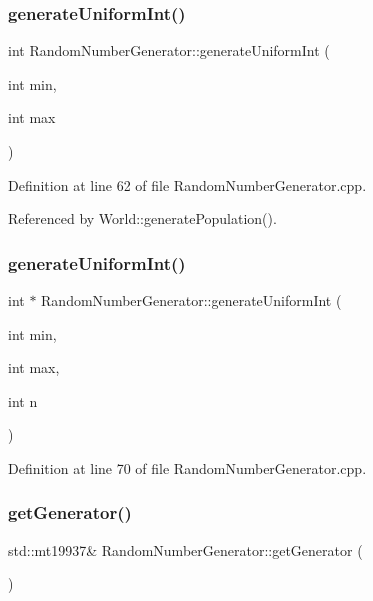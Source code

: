 \subsubsection{generate\+Uniform\+Int()\hspace{0.1cm}{\footnotesize\ttfamily [1/2]}}
{\footnotesize\ttfamily int Random\+Number\+Generator\+::generate\+Uniform\+Int (\begin{DoxyParamCaption}\item[{int}]{min,  }\item[{int}]{max }\end{DoxyParamCaption})}



Definition at line 62 of file Random\+Number\+Generator.\+cpp.



Referenced by World\+::generate\+Population().

\mbox{\label{class_random_number_generator_a13a2a601a80e21008ab04dc15f1f0c0e}} 
\subsubsection{generate\+Uniform\+Int()\hspace{0.1cm}{\footnotesize\ttfamily [2/2]}}
{\footnotesize\ttfamily int $\ast$ Random\+Number\+Generator\+::generate\+Uniform\+Int (\begin{DoxyParamCaption}\item[{int}]{min,  }\item[{int}]{max,  }\item[{int}]{n }\end{DoxyParamCaption})}



Definition at line 70 of file Random\+Number\+Generator.\+cpp.

\mbox{\label{class_random_number_generator_ad6b1e6df06f9f581e67ab803567e8617}} 
\subsubsection{get\+Generator()}
{\footnotesize\ttfamily std\+::mt19937\& Random\+Number\+Generator\+::get\+Generator (\begin{DoxyParamCaption}{ }\end{DoxyParamCaption})\hspace{0.3cm}{\ttfamily [inline]}}



